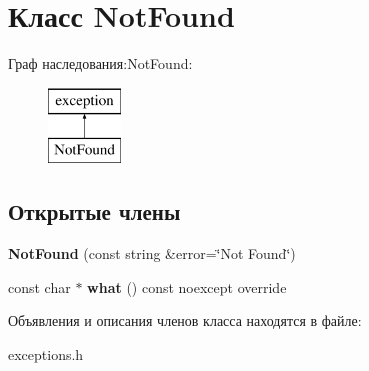 \hypertarget{class_not_found}{}\section{Класс Not\+Found}
\label{class_not_found}
Граф наследования\+:Not\+Found\+:\begin{figure}[H]
\begin{center}
\leavevmode
\includegraphics[height=2.000000cm]{class_not_found}
\end{center}
\end{figure}
\subsection*{Открытые члены}
\begin{DoxyCompactItemize}
\item 
\mbox{\label{class_not_found_a984e1a4ee9253e2c3ebd50f02a586bba}} 
{\bfseries Not\+Found} (const string \&error=\char`\"{}Not Found\char`\"{})
\item 
\mbox{\label{class_not_found_a2fc43887c8d70da989ed7956533703f7}} 
const char $\ast$ {\bfseries what} () const noexcept override
\end{DoxyCompactItemize}


Объявления и описания членов класса находятся в файле\+:\begin{DoxyCompactItemize}
\item 
exceptions.\+h\end{DoxyCompactItemize}
